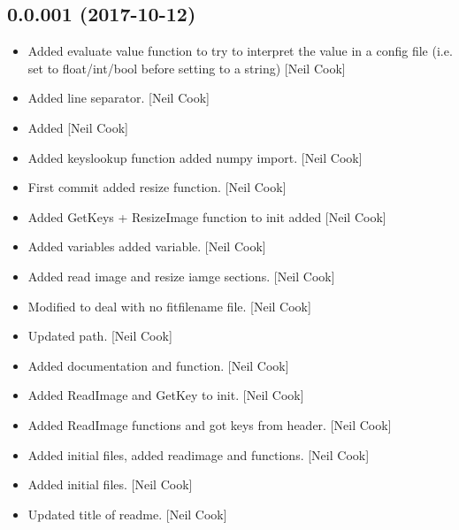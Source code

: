 \documentclass[a4paper,10pt,english]{report}
\begin{document}
\subsection{0.0.001 (2017-10-12)}
\label{\detokenize{misc/changelog:id550}}\begin{itemize}
\item {} 
Added evaluate value function to try to interpret the value in a
config file (i.e. set to float/int/bool before setting to a string)
{[}Neil Cook{]}

\item {} 
Added line separator. {[}Neil Cook{]}

\item {} 
Added  {[}Neil Cook{]}

\item {} 
Added keyslookup function added numpy import. {[}Neil Cook{]}

\item {} 
First commit added resize function. {[}Neil Cook{]}

\item {} 
Added GetKeys + ResizeImage function to init added  {[}Neil
Cook{]}

\item {} 
Added  variables added 
variable. {[}Neil Cook{]}

\item {} 
Added read image and resize iamge sections. {[}Neil Cook{]}

\item {} 
Modified  to deal with no fitfilename file. {[}Neil Cook{]}

\item {} 
Updated  path. {[}Neil Cook{]}

\item {} 
Added  documentation and
 function. {[}Neil Cook{]}

\item {} 
Added ReadImage and GetKey to init. {[}Neil Cook{]}

\item {} 
Added ReadImage functions and got keys from header. {[}Neil Cook{]}

\item {} 
Added initial files, added readimage and  functions.
{[}Neil Cook{]}

\item {} 
Added initial files. {[}Neil Cook{]}

\item {} 
Updated title of readme. {[}Neil Cook{]}

\end{itemize}



\renewcommand{\indexname}{Index}
\printindex
\end{document}
